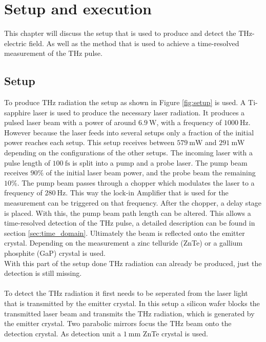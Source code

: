 \chapter{Setup and execution}
This chapter will discuss the setup that is used to produce and detect the $\si{\tera\hertz}$-electric field.
As well as the method that is used to achieve a time-resolved measurement of the $\si{\tera\hertz}$ pulse.

\section{Setup}
\label{sec:setup}
To produce $\si{\tera\hertz}$ radiation the setup as shown in Figure \ref{fig:setup} is used.
A Ti-sapphire laser is used to produce the necessary laser radiation.
It produces a pulsed laser beam with a power of around $\SI{6.9}{\W}$, with a frequency of $\SI{1000}{\Hz}$.
However because the laser feeds into several setups only a fraction of the initial power reaches each setup.
This setup receives between $\SI{579}{\milli\W}$ and $\SI{291}{\milli\W}$ depending on the configurations of the other setups. 
The incoming laser with a pulse length of $\SI{100}{\femto\second}$ is split into a pump and a probe laser.
The pump beam receives $90\%$ of the initial laser beam power, and the probe beam the remaining $10\%$.
The pump beam passes through a chopper which modulates the laser to a frequency of $\SI{280}{\hertz}$.
This way the lock-in Amplifier that is used for the measurement can be triggered on that frequency.
After the chopper, a delay stage is placed.
With this, the pump beam path length can be altered.
This allows a time-resolved detection of the $\si{\tera\hertz}$ pulse, a detailed description can be found in section \ref{sec:time_domain}.
Ultimately the beam is reflected onto the emitter crystal.
Depending on the measurement a zinc telluride (ZnTe) or a gallium phosphite (GaP) crystal is used.
\\
With this part of the setup done $\si{\tera\hertz}$ radiation can already be produced, just the detection is still missing.
\\\\
To detect the $\si{\tera\hertz}$ radiation it first needs to be seperated from the laser light that is transmitted by the emitter crystal.
In this setup a silicon wafer blocks the transmitted laser beam and transmits the $\si{\tera\hertz}$ radiation, which is generated by the emitter crystal.
Two parabolic mirrors focus the $\si{\tera\hertz}$ beam onto the detection crystal.
As detection unit a $\SI{1}{\milli\meter}$ ZnTe crystal is used.
